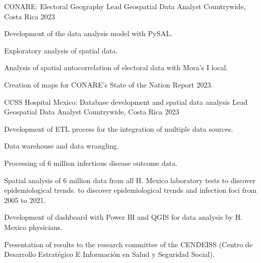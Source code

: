 

\begin{cventries}
\cventry
  {CONARE: Electoral Geography} %
  {Lead Geospatial Data Analyst} %
  {Countrywide, Costa Rica} %
  {2023} %
  {
    \begin{cvitems} %
      \item Development of the data analysis model with PySAL.
      \item Exploratory analysis of spatial data.
      \item Analysis of spatial autocorrelation of electoral data
      with Mora's I local.
      \item Creation of maps for CONARE's State of the Nation Report 2023.
    \end{cvitems}
  }
\cventry
  {CCSS Hospital Mexico: Database development and spatial data analysis} %
  {Lead Geospatial Data Analyst} %
  {Countrywide, Costa Rica} %
  {2023} %
  {
    \begin{cvitems} %
      \item Development of ETL process for the integration of multiple data sources.
      \item Data warehouse and data wrangling.
      \item Processing of 6 million infectious disease outcome data.
      \item Spatial analysis of 6 million data from all H. Mexico laboratory tests to
      discover epidemiological trends. to discover epidemiological trends and infection
      foci from 2005 to 2021.
      \item Development of dashboard with Power BI and QGIS for data analysis by H.
      Mexico physicians.
      \item Presentation of results to the research committee of the CENDEISS (Centro de
      Desarrollo Estratégico E Información en Salud y Seguridad Social).
    \end{cvitems}
}
\end{cventries}
